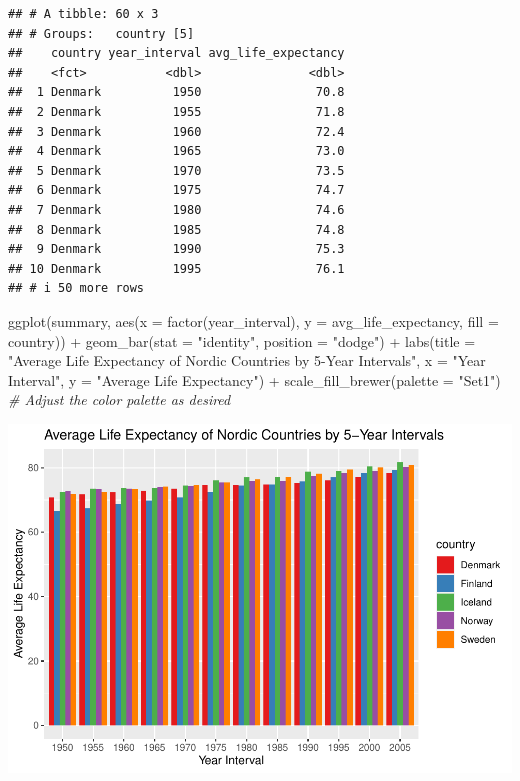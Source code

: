 \documentclass[
]{book}
\newenvironment{Shaded}{\begin{snugshade}}{\end{snugshade}}
\newcommand{\AttributeTok}[1]{\textcolor[rgb]{0.77,0.63,0.00}{#1}}
\newcommand{\CommentTok}[1]{\textcolor[rgb]{0.56,0.35,0.01}{\textit{#1}}}
\newcommand{\FunctionTok}[1]{\textcolor[rgb]{0.00,0.00,0.00}{#1}}
\newcommand{\NormalTok}[1]{#1}
\newcommand{\SpecialCharTok}[1]{\textcolor[rgb]{0.00,0.00,0.00}{#1}}
\newcommand{\StringTok}[1]{\textcolor[rgb]{0.31,0.60,0.02}{#1}}
\begin{document}
\begin{verbatim}
## # A tibble: 60 x 3
## # Groups:   country [5]
##    country year_interval avg_life_expectancy
##    <fct>           <dbl>               <dbl>
##  1 Denmark          1950                70.8
##  2 Denmark          1955                71.8
##  3 Denmark          1960                72.4
##  4 Denmark          1965                73.0
##  5 Denmark          1970                73.5
##  6 Denmark          1975                74.7
##  7 Denmark          1980                74.6
##  8 Denmark          1985                74.8
##  9 Denmark          1990                75.3
## 10 Denmark          1995                76.1
## # i 50 more rows
\end{verbatim}

\begin{Shaded}
\begin{Highlighting}[]
\FunctionTok{ggplot}\NormalTok{(summary, }\FunctionTok{aes}\NormalTok{(}\AttributeTok{x =} \FunctionTok{factor}\NormalTok{(year\_interval), }\AttributeTok{y =}\NormalTok{ avg\_life\_expectancy, }\AttributeTok{fill =}\NormalTok{ country)) }\SpecialCharTok{+}
  \FunctionTok{geom\_bar}\NormalTok{(}\AttributeTok{stat =} \StringTok{"identity"}\NormalTok{, }\AttributeTok{position =} \StringTok{"dodge"}\NormalTok{) }\SpecialCharTok{+}
  \FunctionTok{labs}\NormalTok{(}\AttributeTok{title =} \StringTok{"Average Life Expectancy of Nordic Countries by 5{-}Year Intervals"}\NormalTok{, }\AttributeTok{x =} \StringTok{"Year Interval"}\NormalTok{, }\AttributeTok{y =} \StringTok{"Average Life Expectancy"}\NormalTok{) }\SpecialCharTok{+}
  \FunctionTok{scale\_fill\_brewer}\NormalTok{(}\AttributeTok{palette =} \StringTok{"Set1"}\NormalTok{)  }\CommentTok{\# Adjust the color palette as desired}
\end{Highlighting}
\end{Shaded}

\includegraphics{data_files/figure-latex/unnamed-chunk-22-1.pdf}
\end{document}
